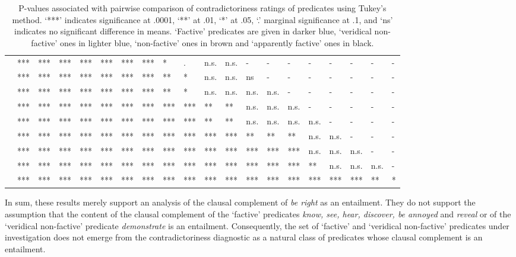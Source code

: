 \documentclass[11pt,fleqn]{article}
\newcommand{\6}{\mbox{$[\hspace*{-.6mm}[$}}
\newcommand{\9}{\mbox{$]\hspace*{-.6mm}]$}}
\begin{document}
{\begin{table}[H]
\begin{tabular}{l l l l l l l l l l l l l l l l l l l l }
\color{black}{\em admit}\color{black}			& *** & *** & *** & *** & *** & *** & *** & * & . & n.s. & n.s. & - & - & - & - & - & - & - & - \\
\color{black}{\em establish}\color{black}		& *** & *** & *** & *** & *** & *** & *** & ** & * & n.s. & n.s. &  ns & - & - & - & - & - & - & - \\
\color{airforceblue}{\em demonstrate}\color{black}	& *** & *** & *** & *** & *** & *** & *** & ** & * & n.s. & n.s. & n.s. & n.s. & - & - & - & - & - & - \\
\color{black}{\em confirm}\color{black}		& *** & *** & *** & *** & *** & *** & *** & *** & *** & ** & ** & n.s. & n.s. & n.s. & - & - & - & - & - \\
\color{blue}{\em discover}\color{black}		& *** & *** & *** & *** & *** & *** & *** & *** & *** & ** & ** & n.s. & n.s. & n.s. & n.s. & - & - & - & - \\
\color{blue}{\em see}\color{black}			& *** & *** & *** & *** & *** & *** & *** & *** & *** & *** & *** & ** & ** & ** & n.s. & n.s. & - & - & - \\
\color{blue}{\em know}\color{black}			& *** & *** & *** & *** & *** & *** & *** & *** & *** & *** & *** & *** & *** & *** & n.s. & n.s. & n.s. & - & - \\
\color{black}{\em prove}\color{black}			& *** & *** & *** & *** & *** & *** & *** & *** & *** & *** & *** & *** & *** & *** & ** & n.s. & n.s. & n.s. & -  \\
\color{airforceblue}{\em be right}\color{black}		& *** & *** & *** & *** & *** & *** & *** & *** & ***  & ***  & *** & *** & *** & *** & *** & *** & *** & ** & *  \\

\bottomrule
\end{tabular}
\caption{P-values associated with pairwise comparison of contradictoriness ratings of predicates using Tukey's method. `***' indicates significance at .0001, `**' at .01, `*' at .05, `.' marginal significance at .1, and `ns' indicates no significant difference in means. `Factive' predicates are given in darker blue, `veridical non-factive' ones in lighter blue, `non-factive' ones in brown and `apparently factive' ones in black.}\label{t-pairwise}
\end{table}

In sum, these results merely support an analysis of the clausal complement of {\em be right} as an entailment. They do not support the assumption that the content of the clausal complement of the `factive' predicates {\em know, see, hear, discover, be annoyed} and {\em reveal} or of the `veridical non-factive' predicate {\em demonstrate} is an entailment. Consequently, the set of `factive' and `veridical non-factive' predicates under investigation does not emerge from the contradictoriness diagnostic as a natural class of predicates whose clausal complement is an entailment. 

}
\end{document}
